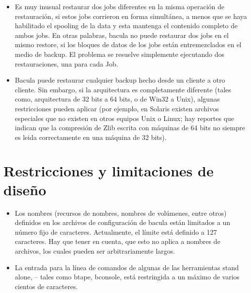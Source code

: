 \begin{itemize}
\item Es muy inusual restaurar dos jobs diferentes en la misma operación de restauración,
   si estos jobs corrieron en forma simultánea, a menos que se haya habilitado el spooling
   de la data y esta mantenga el contenido completo de ambos jobs. En otras palabras,
   bacula no puede restaurar dos jobs en el mismo restore, si los bloques de datos de
   los jobs están entremezclados en el medio de backup. El problema se resuelve simplemente
   ejecutando dos restauraciones, una para cada Job.
\item Bacula puede restaurar cualquier backup hecho desde un cliente a otro cliente. Sin
   embargo, si la arquitectura es completamente diferente (tales como, arquitectura
   de 32 bits a 64 bits, o de Win32 a Unix), algunas restricciones pueden aplicar (por
   ejemplo, en Solaris existen archivos especiales que no existen en otros equipos Unix
   o Linux; hay reportes que indican que la compresión de Zlib escrita con máquinas
   de 64 bits no siempre es leida correctamente en una máquina de 32 bits).
\end{itemize}

\section{Restricciones y limitaciones de diseño}

\begin{itemize}
\item Los nombres (recursos de nombres, nombres de volúmenes, entre otros) definidos en
   los archivos de configuración de bacula están limitados a un número fijo de caracteres.
   Actualmente, el límite está definido a 127 caracteres. Hay que tener en cuenta, que
   esto no aplica a nombres de archivos, los cuales pueden ser arbitrariamente largos. 
\item La entrada para la línea de comandos de algunas de las herramientas stand alone, 
   -- tales como btape, bconsole, está restringida a un máximo de varios cientos de caracteres. 
\end{itemize}

